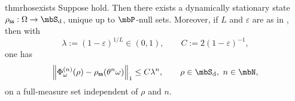 \documentclass[a4paper]{article}
\numberwithin{equation}{section}   %
\theoremstyle{plain}   %
\theoremstyle{plain}   %
\theoremstyle{examplestyle}
\DeclareMathOperator{\states}{\mbS_d}   %
\DeclareMathOperator{\pr}{\mbP}           %
\newcommand{\s}{\rho_{\mathsf{ss}}}     %
\newcommand{\unorm}[1]{\left\lVert#1\right\rVert}
\begin{document}
    \begin{restatable}[]{thm}{rhosexists}
    \label{thm:rho_ss_exists}
        Suppose  hold.
        Then there exists a dynamically stationary state $\s:\Omega\to\states$, unique up to $\pr$-null sets.
        Moreover, if $L$ and $\varepsilon$ are as in , then with
        \[
             \lambda:=(1-\varepsilon)^{1/L}\in(0,1),
             \qquad C:=2(1-\varepsilon)^{-1},
        \]
        one has
        \begin{equation}
        \label{eq:doeblin-prop-forgetting-pointwise}
             \unorm{\Phi^{(n)}_\omega(\rho)-\s(\theta^n\omega)}_1
             \le C\lambda^n,
             \qquad \rho\in\states,\ n\in\mbN,
        \end{equation}
        on a full-measure set independent of $\rho$ and $n$.
    \end{restatable}
\end{document}
